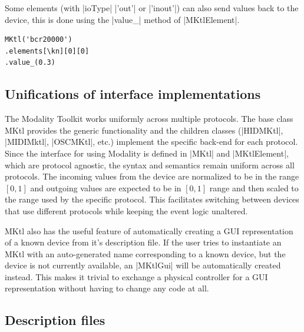 \documentclass{article}
\begin{document}
Some elements (with |ioType| |'out'| or |'inout'|) can also send values back to the device, this is done using the |value_| method of |MKtlElement|.

\begin{Verbatim}	
MKtl('bcr20000')
.elements[\kn][0][0]
.value_(0.3)
\end{Verbatim}

\subsection{Unifications of interface implementations}
\label{sub:unifications_of_interface_implementations}

The Modality Toolkit works uniformly across multiple protocols. The base class MKtl provides the generic functionality and the children classes (|HIDMKtl|, |MIDIMktl|, |OSCMKtl|, etc.) implement the specific back-end for each protocol. Since the interface for using Modality is defined in |MKtl| and |MKtlElement|, which are protocol agnostic, the syntax and semantics remain uniform across all protocols. The incoming values from the device are normalized to be in the range $[0,1]$ and outgoing values are expected to be in $[0,1]$ range and then scaled to the range used by the specific protocol. This facilitates switching between devices that use different protocols while keeping the event logic unaltered.

MKtl also has the useful feature of automatically creating a GUI representation of a known device from it's description file. If the user tries to instantiate an MKtl with an auto-generated name corresponding to a known device, but the device is not currently available, an |MKtlGui| will be automatically created instead. This makes it trivial to exchange a physical controller for a GUI representation without having to change any code at all.

\subsection{Description files}
\label{sub:descriptions_files}
\end{document}
